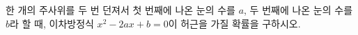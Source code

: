 한 개의 주사위를 두 번 던져서 첫 번째에 나온 눈의 수를 $a$, 두 번째에 나온 눈의 수를 $b$라 할 때, 이차방정식 $x^2-2ax+b=0$이 허근을 가질 확률을 구하시오.
